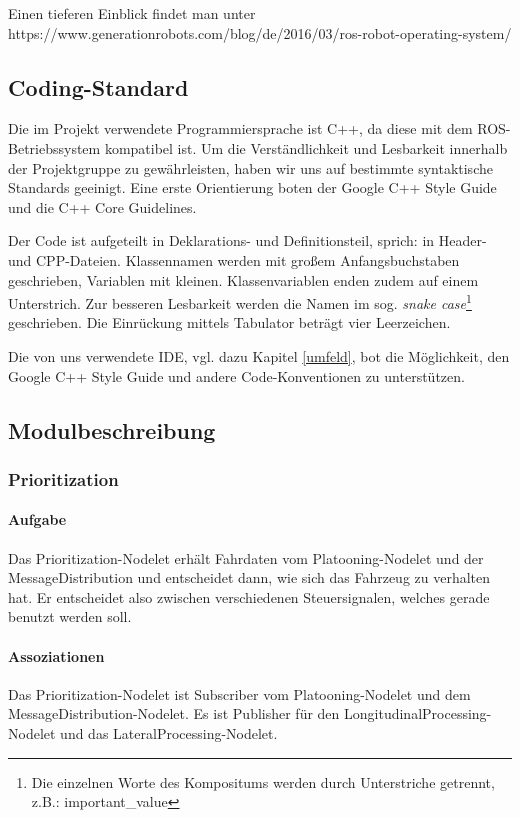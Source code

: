 \documentclass[a4paper, 12pt, titlepage]{scrartcl}
\begin{document}
		Einen tieferen Einblick findet man unter\\
		https://www.generationrobots.com/blog/de/2016/03/ros-robot-operating-system/

		\subsection{Coding-Standard}
		\label{coding_standard}
			Die im Projekt verwendete Programmiersprache ist C++, da diese mit dem ROS-Betriebssystem kompatibel ist.
			Um die Verständlichkeit und Lesbarkeit innerhalb der Projektgruppe zu gewährleisten, haben wir uns auf
			bestimmte syntaktische Standards geeinigt. Eine erste Orientierung boten der Google C++ Style Guide\cite{googleTest} und die C++ Core Guidelines\cite{cppCoreGuide}.

			Der Code ist aufgeteilt in Deklarations- und Definitionsteil, sprich: in Header- und CPP-Dateien.
			Klassennamen werden mit großem Anfangsbuchstaben geschrieben, Variablen mit kleinen. Klassenvariablen enden zudem
			auf einem Unterstrich. Zur besseren Lesbarkeit werden die Namen im sog. \emph{snake case}\footnote{Die einzelnen
			Worte des Kompositums werden durch Unterstriche getrennt, z.B.: important\_value} geschrieben.
			Die Einrückung mittels Tabulator beträgt vier Leerzeichen.

			Die von uns verwendete IDE, vgl. dazu Kapitel \ref{umfeld}, bot die Möglichkeit, den Google C++ Style Guide und andere Code-Konventionen zu unterstützen.

		\subsection{Modulbeschreibung}
		\label{modulbeschreibung}
			\subsubsection{Prioritization}
			\label{prioritization}
				\paragraph{Aufgabe} Das Prioritization-Nodelet erhält Fahrdaten vom Platooning-Nodelet und der MessageDistribution und entscheidet dann, wie sich das Fahrzeug zu verhalten hat. Er entscheidet also zwischen verschiedenen Steuersignalen, welches gerade benutzt werden soll.
				\paragraph{Assoziationen} Das Prioritization-Nodelet ist Subscriber vom Platooning-Nodelet und dem MessageDistribution-Nodelet. Es ist Publisher für den LongitudinalProcessing-Nodelet und das LateralProcessing-Nodelet.
\end{document}
